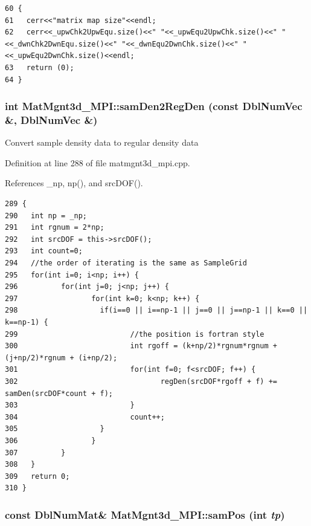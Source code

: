 \footnotesize\begin{verbatim}60 {
61   cerr<<"matrix map size"<<endl;
62   cerr<<_upwChk2UpwEqu.size()<<" "<<_upwEqu2UpwChk.size()<<" "<<_dwnChk2DwnEqu.size()<<" "<<_dwnEqu2DwnChk.size()<<" "<<_upwEqu2DwnChk.size()<<endl;
63   return (0);
64 }
\end{verbatim}\normalsize 


\subsubsection{\setlength{\rightskip}{0pt plus 5cm}int Mat\-Mgnt3d\_\-MPI::sam\-Den2Reg\-Den (const Dbl\-Num\-Vec \&, Dbl\-Num\-Vec \&)}\label{classMatMgnt3d__MPI_fa20d80fbb117bd78c6bad8de4964df7_fa20d80fbb117bd78c6bad8de4964df7}


Convert sample density data to regular density data 

Definition at line 288 of file matmgnt3d\_\-mpi.cpp.

References \_\-np, np(), and src\-DOF().

\footnotesize\begin{verbatim}289 {
290   int np = _np;
291   int rgnum = 2*np;
292   int srcDOF = this->srcDOF();
293   int count=0;
294   //the order of iterating is the same as SampleGrid
295   for(int i=0; i<np; i++) {
296          for(int j=0; j<np; j++) {
297                 for(int k=0; k<np; k++) {
298                   if(i==0 || i==np-1 || j==0 || j==np-1 || k==0 || k==np-1) {
299                          //the position is fortran style
300                          int rgoff = (k+np/2)*rgnum*rgnum + (j+np/2)*rgnum + (i+np/2);
301                          for(int f=0; f<srcDOF; f++) {
302                                 regDen(srcDOF*rgoff + f) += samDen(srcDOF*count + f);
303                          }      
304                          count++;
305                   }
306                 }
307          }
308   }
309   return 0;
310 }
\end{verbatim}\normalsize 


\subsubsection{\setlength{\rightskip}{0pt plus 5cm}const Dbl\-Num\-Mat\& Mat\-Mgnt3d\_\-MPI::sam\-Pos (int {\em tp})\hspace{0.3cm}{\tt  [inline]}}\label{classMatMgnt3d__MPI_86bc928d5146f28060644f8132bfbadd_86bc928d5146f28060644f8132bfbadd}


